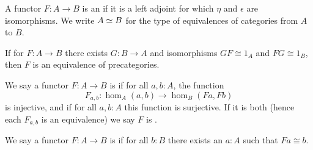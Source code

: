 \documentclass[hott-all.tex]{subfiles}
\begin{document}
\begin{defn}
  A functor $F:A\to B$ is an 
  if it is a left adjoint for which $\eta$ and $\epsilon$ are isomorphisms.
  We write $A \simeq B$ for the type of equivalences of categories from $A$ to $B$.
\end{defn}


\begin{lem}
  If for $F:A\to B$ there exists $G:B\to A$ and isomorphisms $GF\cong 1_A$ and $FG\cong 1_B$, then $F$ is an equivalence of precategories.
\end{lem}

\begin{defn}
  We say a functor $F:A\to B$ is 
  if for all $a,b:A$, the function
  \[F_{a,b}:\hom_A(a,b) \to \hom_B(Fa,Fb)\]
  is injective, and 
  if for all $a,b:A$ this function is surjective.
  If it is both (hence each $F_{a,b}$ is an equivalence) we say $F$ is .
\end{defn}

\begin{defn}
  We say a functor $F:A\to B$ is 
  if for all $b:B$ there exists an $a:A$ such that $Fa\cong b$.
\end{defn}
\end{document}
